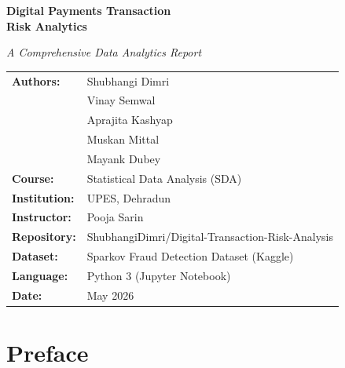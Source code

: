 \documentclass[12pt,a4paper]{report}
\begin{document}
\begin{titlepage}
\centering
\vspace*{1.5cm}
\vspace{0.8cm}
{\fontsize{22}{28}\selectfont\bfseries Digital Payments Transaction\\[6pt] Risk Analytics}
\vspace{0.5cm}
\vspace{0.6cm}

{\large\itshape A Comprehensive Data Analytics Report}
\vspace{1.8cm}

\begin{tabular}{ll}
\textbf{Authors:}    & Shubhangi Dimri \\[4pt]
                     & Vinay Semwal \\[4pt]
                     & Aprajita Kashyap  \\[4pt]
                     & Muskan Mittal \\[4pt]
                     & Mayank Dubey \\[10pt]
\textbf{Course:}     & Statistical Data Analysis (SDA) \\[4pt]
\textbf{Institution:}& UPES, Dehradun \\[4pt]
\textbf{Instructor:} & Pooja Sarin \\[10pt]
\textbf{Repository:} & ShubhangiDimri/Digital-Transaction-Risk-Analysis \\[4pt]
\textbf{Dataset:}    & Sparkov Fraud Detection Dataset (Kaggle) \\[4pt]
\textbf{Language:}   & Python 3 (Jupyter Notebook) \\[4pt]
\textbf{Date:}       & May 2026 \\
\end{tabular}


\end{titlepage}

\begingroup
\setlength{\cftbeforechapskip}{4pt}
\tableofcontents
\endgroup
\listoftables
\listoffigures
\thispagestyle{empty}
\clearpage

\chapter*{Preface}
\end{document}
